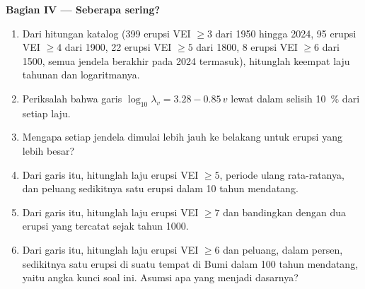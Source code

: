 \begin{problem}
\noindent\textbf{Bagian IV --- Seberapa sering?}
\begin{enumerate}[resume]
\item Dari hitungan katalog (399 erupsi VEI $\ge 3$ dari 1950 hingga
2024, 95 erupsi VEI $\ge 4$ dari 1900, 22 erupsi VEI $\ge 5$ dari 1800, 8 erupsi VEI $\ge 6$ dari
1500, semua jendela berakhir pada 2024 termasuk), hitunglah keempat laju tahunan dan
logaritmanya.
\item Periksalah bahwa garis $\log_{10}\lambda_v = 3.28 - 0.85\,v$ lewat dalam selisih
\qty{10}{\percent} dari setiap laju.
\item Mengapa setiap jendela dimulai lebih jauh ke belakang untuk erupsi yang lebih besar?
\item Dari garis itu, hitunglah laju erupsi VEI $\ge 5$, periode ulang
rata-ratanya, dan peluang sedikitnya satu erupsi dalam 10 tahun mendatang.
\item Dari garis itu, hitunglah laju erupsi VEI $\ge 7$ dan bandingkan
dengan dua erupsi yang tercatat sejak tahun 1000.
\item Dari garis itu, hitunglah laju erupsi VEI $\ge 6$ dan
peluang, dalam persen, sedikitnya satu erupsi di suatu tempat di Bumi dalam 100
tahun mendatang, yaitu angka kunci soal ini. Asumsi apa yang menjadi dasarnya?
\end{enumerate}
\end{problem}
